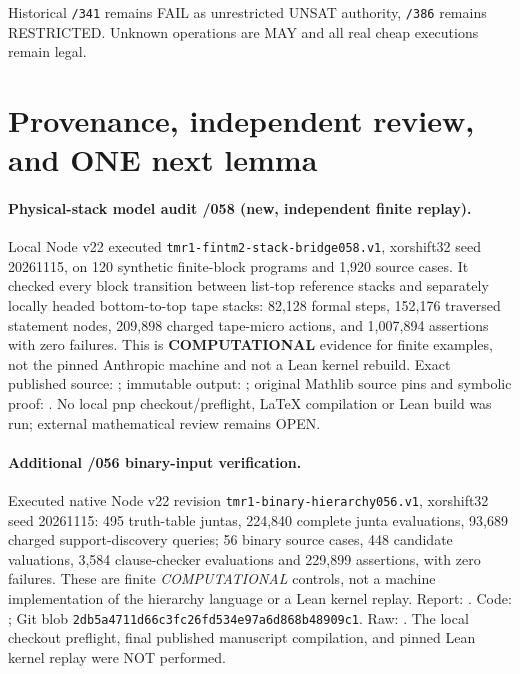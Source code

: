 \documentclass[11pt]{article}
\begin{document}
Historical \texttt{/341} remains FAIL as unrestricted UNSAT authority,
\texttt{/386} remains RESTRICTED. Unknown operations are MAY and all real
cheap executions remain legal.

\section{Provenance, independent review, and ONE next lemma}
\paragraph{Physical-stack model audit /058 (new, independent finite replay).}
Local Node v22 executed \texttt{tmr1-fintm2-stack-bridge058.v1},
xorshift32 seed 20261115, on 120 synthetic finite-block
programs and 1,920 source cases. It checked every block transition
between list-top reference stacks and separately locally headed
bottom-to-top tape stacks: 82,128 formal steps, 152,176 traversed
statement nodes, 209,898 charged tape-micro actions, and
1,007,894 assertions with zero failures.
This is \textbf{COMPUTATIONAL} evidence for finite examples,
not the pinned Anthropic machine and not a Lean kernel rebuild.
Exact published source:
;
immutable output:
;
original Mathlib source pins and symbolic proof:
.
No local pnp checkout/preflight, LaTeX compilation or Lean build was run;
external mathematical review remains OPEN.


\paragraph{Additional /056 binary-input verification.}
Executed native Node v22 revision \texttt{tmr1-binary-hierarchy056.v1},
xorshift32 seed 20261115: 495 truth-table juntas, 224,840 complete
junta evaluations, 93,689 charged support-discovery queries; 56 binary
source cases, 448 candidate valuations, 3,584 clause-checker evaluations
and 229,899 assertions, with zero failures. These are finite
\emph{COMPUTATIONAL} controls, not a machine implementation of the
hierarchy language or a Lean kernel replay.
Report: .
Code: ;
Git blob \texttt{2db5a4711d66c3fc26fd534e97a6d868b48909c1}.
Raw: .
The local checkout preflight, final published manuscript compilation,
and pinned Lean kernel replay were NOT performed.
\end{document}
